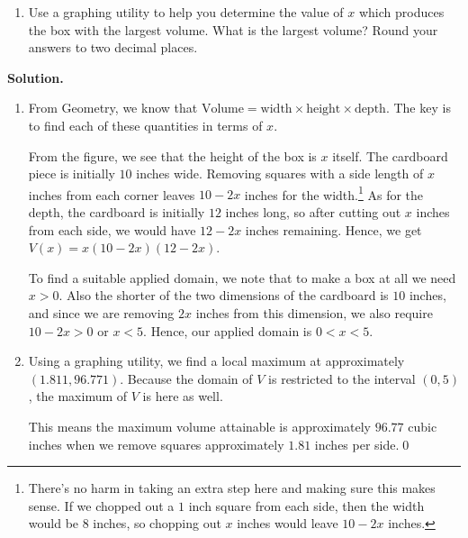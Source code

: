 \documentclass{ximera}
\begin{document}
\begin{example}
\begin{enumerate}
\item  Use a graphing utility to help you determine the value of $x$ which produces the box with the largest volume.  What is the largest volume?  Round your answers to two decimal places.

\end{enumerate}

{\bf Solution.} 

\begin{enumerate}

\item  From Geometry, we know that $\text{Volume} = \text{width} \times \text{height} \times \text{depth}$.  The key is to find each of these quantities in terms of $x$.  


From the figure, we see that the height of the box is $x$ itself.  The cardboard piece is initially $10$ inches wide.  Removing squares with a side length of $x$ inches from each corner leaves $10-2x$ inches for the width.\footnote{There's no harm in taking an extra step here and making sure this makes sense.  If we chopped out a $1$ inch square from each side, then the width would be $8$ inches, so chopping out $x$ inches would leave $10-2x$ inches.}   As for the depth, the cardboard is initially $12$ inches long, so after cutting out $x$ inches from each side, we would have $12-2x$ inches remaining. Hence, we get $V(x) = x(10-2x)(12-2x)$.  


To find a suitable applied domain, we note that to make a box at all we need $x > 0$.  Also the shorter of the two dimensions of the cardboard is $10$ inches, and since we are removing $2x$ inches from this dimension, we also require $10 - 2x > 0$ or $x < 5$.  Hence, our applied domain is $0 < x < 5$.

\item  Using a graphing utility, we find a local maximum at approximately $(1.811, 96.771)$.  Because the domain of $V$ is restricted to the interval $(0,5)$,  the maximum of $V$ is here as well.





\begin{center}
\end{center}

This means the maximum volume attainable is approximately $96.77$ cubic inches when we remove squares approximately $1.81$ inches per side.\qed
 
\end{enumerate}
\label{openbox}
\end{example}
\end{document}
